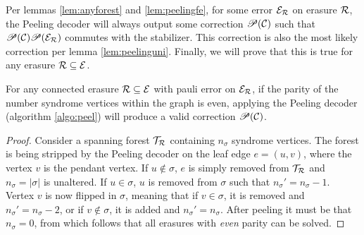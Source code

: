 Per lemmas \ref{lem:anyforest} and \ref{lem:peelingfe}, for some error $\mathcal{E}_{\mathcal{R}}$ on erasure $\mathcal{R}$, the Peeling decoder will always output some correction $\mathscr{P}(\mathcal{C})$ such that $\mathscr{P}(\mathcal{C})\mathscr{P}(\mathcal{E}_{\mathcal{R}})$ commutes with the stabilizer. This correction is also the most likely correction per lemma \ref{lem:peelinguni}. Finally, we will prove that this is true for any erasure $\mathcal{R}\subseteq \mathcal{E}$.
\begin{theorem}\label{the:anyevenparity}
  For any connected erasure $\mathcal{R}\subseteq \mathcal{E}$ with pauli error on $\mathcal{E}_{\mathcal{R}}$, if the parity of the number syndrome vertices within the graph is even, applying the Peeling decoder (algorithm \ref{algo:peel}) will produce a valid correction $\mathscr{P}(\mathcal{C})$.
\end{theorem}
\begin{proof}
  Consider a spanning forest $\mathcal{T}_{\mathcal{R}}$ containing $n_\sigma$ syndrome vertices. The forest is being stripped by the Peeling decoder on the leaf edge $e = (u,v)$, where the vertex $v$ is the pendant vertex. If $u\notin\sigma$, $e$ is simply removed from $\mathcal{T}_{\mathcal{R}}$ and $n_\sigma = |\sigma|$ is unaltered. If $u\in\sigma$, $u$ is removed from $\sigma$ such that $n_\sigma'= n_\sigma -1$. Vertex $v$ is now flipped in $\sigma$, meaning that if $v\in\sigma$, it is removed and $n_\sigma'= n_\sigma -2$, or if  $v\notin\sigma$, it is added and $n_\sigma'= n_\sigma$. After peeling it must be that $n_\sigma=0$, from which follows that all erasures with \emph{even} parity can be solved.
\end{proof}

